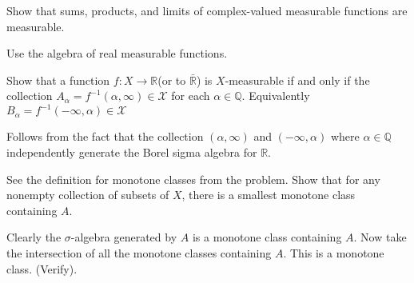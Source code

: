 \begin{exercise}[T]
	Show that sums, products, and limits of complex-valued measurable functions are measurable.
\end{exercise}
\begin{solution}
	Use the algebra of real measurable functions.
\end{solution}

\begin{exercise}[U]
	Show that a function $f: X \to \mathbb{R}$(or to $\bar{\mathbb{R}}$) is $X$-measurable if and only if the collection $A_\alpha = f^{-1}(\alpha, \infty) \in \mathcal{X}$ for each $\alpha \in \mathbb{Q}$. Equivalently $B_\alpha = f^{-1}(-\infty, \alpha) \in  \mathcal{X}$
\end{exercise}
\begin{solution}
	Follows from the fact that the collection $(\alpha, \infty)$ and $(-\infty , \alpha)$ where $\alpha \in \mathbb{Q}$ independently generate the Borel sigma algebra for $\mathbb{R}$.
\end{solution}

\begin{exercise}[V]
	See the definition for monotone classes from the problem. Show that for any nonempty collection of subsets of $X$, there is a smallest monotone class containing $A$.
\end{exercise}
\begin{solution}
	Clearly the $\sigma$-algebra generated by $A$ is a monotone class containing $A$. Now take the intersection of all the monotone classes containing $A$. This is a monotone class. (Verify).
\end{solution}

